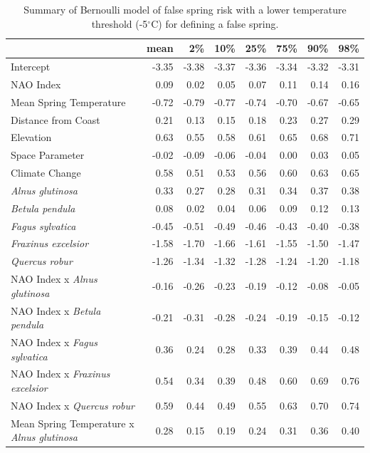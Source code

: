 \documentclass{article}\usepackage[]{graphicx}\usepackage[]{color}
\begin{document}
\newpage 
\begin{longtable}{lrrrrrrr}
\caption{Summary of Bernoulli model of false spring risk with a lower temperature threshold (-5$^{\circ}$C) for defining a false spring.} \\ 
  \hline
 & mean & 2\% & 10\% & 25\% & 75\% & 90\% & 98\% \\ 
  \hline \endhead  \hline
Intercept & -3.35 & -3.38 & -3.37 & -3.36 & -3.34 & -3.32 & -3.31 \\ 
  NAO Index & 0.09 & 0.02 & 0.05 & 0.07 & 0.11 & 0.14 & 0.16 \\ 
  Mean Spring 
Temperature & -0.72 & -0.79 & -0.77 & -0.74 & -0.70 & -0.67 & -0.65 \\ 
  Distance from 
Coast & 0.21 & 0.13 & 0.15 & 0.18 & 0.23 & 0.27 & 0.29 \\ 
  Elevation & 0.63 & 0.55 & 0.58 & 0.61 & 0.65 & 0.68 & 0.71 \\ 
  Space Parameter & -0.02 & -0.09 & -0.06 & -0.04 & 0.00 & 0.03 & 0.05 \\ 
  Climate Change & 0.58 & 0.51 & 0.53 & 0.56 & 0.60 & 0.63 & 0.65 \\ 
  \textit{Alnus glutinosa} & 0.33 & 0.27 & 0.28 & 0.31 & 0.34 & 0.37 & 0.38 \\ 
  \textit{Betula pendula} & 0.08 & 0.02 & 0.04 & 0.06 & 0.09 & 0.12 & 0.13 \\ 
  \textit{Fagus sylvatica} & -0.45 & -0.51 & -0.49 & -0.46 & -0.43 & -0.40 & -0.38 \\ 
  \textit{Fraxinus excelsior} & -1.58 & -1.70 & -1.66 & -1.61 & -1.55 & -1.50 & -1.47 \\ 
  \textit{Quercus robur} & -1.26 & -1.34 & -1.32 & -1.28 & -1.24 & -1.20 & -1.18 \\ 
  NAO Index
x\textit{ Alnus glutinosa} & -0.16 & -0.26 & -0.23 & -0.19 & -0.12 & -0.08 & -0.05 \\ 
  NAO Index
x\textit{ Betula pendula} & -0.21 & -0.31 & -0.28 & -0.24 & -0.19 & -0.15 & -0.12 \\ 
  NAO Index
x\textit{ Fagus sylvatica} & 0.36 & 0.24 & 0.28 & 0.33 & 0.39 & 0.44 & 0.48 \\ 
  NAO Index
x\textit{ Fraxinus excelsior} & 0.54 & 0.34 & 0.39 & 0.48 & 0.60 & 0.69 & 0.76 \\ 
  NAO Index
x\textit{ Quercus robur} & 0.59 & 0.44 & 0.49 & 0.55 & 0.63 & 0.70 & 0.74 \\ 
  Mean Spring 
Temperature
x\textit{ Alnus glutinosa} & 0.28 & 0.15 & 0.19 & 0.24 & 0.31 & 0.36 & 0.40 \\ 

\end{longtable}
\end{document}
